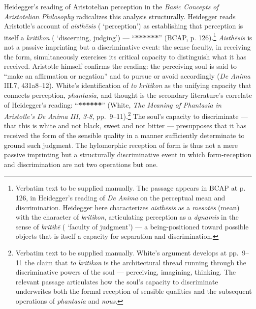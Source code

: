 Heidegger's reading of Aristotelian perception in the \textit{Basic Concepts of Aristotelian Philosophy} radicalizes this analysis structurally. Heidegger reads Aristotle's account of \textit{aisthēsis} ( `perception') as establishing that perception is itself a \textit{kritikon} ( `discerning, judging') --- ``\textbf{******}'' (BCAP, p. 126).\footnote{Verbatim text to be supplied manually. The passage appears in BCAP at p. 126, in Heidegger's reading of \textit{De Anima} on the perceptual mean and discrimination. Heidegger here characterizes \textit{aisthēsis} as a \textit{mesotēs} (mean) with the character of \textit{kritikon}, articulating perception as a \textit{dynamis} in the sense of \textit{kritikē} ( `faculty of judgment') --- a being-positioned toward possible objects that is itself a capacity for separation and discrimination.} \textit{Aisthēsis} is not a passive imprinting but a discriminative event: the sense faculty, in receiving the form, simultaneously exercises its critical capacity to distinguish what it has received. Aristotle himself confirms the reading: the perceiving soul is said to ``make an affirmation or negation'' and to pursue or avoid accordingly (\textit{De Anima} III.7, 431a8--12). White's identification of \textit{to kritikon} as the unifying capacity that connects perception, \textit{phantasia}, and thought is the secondary literature's correlate of Heidegger's reading: ``\textbf{******}'' (White, \textit{The Meaning of Phantasia in Aristotle's De Anima III, 3-8}, pp.~9--11).\footnote{Verbatim text to be supplied manually. White's argument develops at pp.~9--11 the claim that \textit{to kritikon} is the architectural thread running through the discriminative powers of the soul --- perceiving, imagining, thinking. The relevant passage articulates how the soul's capacity to discriminate underwrites both the formal reception of sensible qualities and the subsequent operations of \textit{phantasia} and \textit{nous}.} The soul's capacity to discriminate --- that this is white and not black, sweet and not bitter --- presupposes that it has received the form of the sensible quality in a manner sufficiently determinate to ground such judgment. The hylomorphic reception of form is thus not a mere passive imprinting but a structurally discriminative event in which form-reception and discrimination are not two operations but one.


